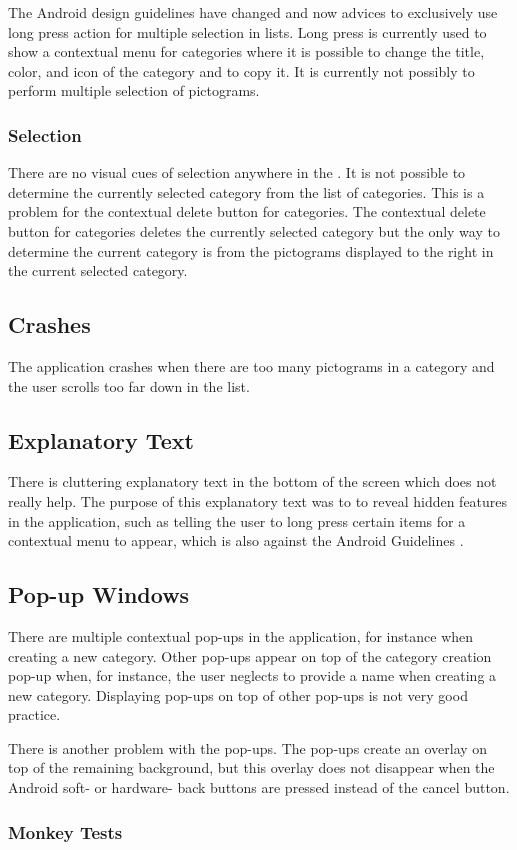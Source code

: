 The Android design guidelines have changed and now advices to exclusively use long press action for multiple selection in lists. Long press is currently used to show a contextual menu for categories where it is possible to change the title, color, and icon of the category and to copy it. It is currently not possibly to perform multiple selection of pictograms. 

\subsubsection{Selection}

There are no visual cues of selection anywhere in the \ct. It is not possible to determine the currently selected category from the list of categories. This is a problem for the contextual delete button for categories. The contextual delete button for categories deletes the currently selected category but the only way to determine the current category is from the pictograms displayed to the right in the current selected category. 

\subsection{Crashes}

The application crashes when there are too many pictograms in a category and the user scrolls too far down in the list. 

\subsection{Explanatory Text}

There is cluttering explanatory text in the bottom of the screen which does not really help. The purpose of this explanatory text was to to reveal hidden features in the application, such as telling the user to long press certain items for a contextual menu to appear, which is also against the Android Guidelines \parencite{android_guidelines_longpress}.

\subsection{Pop-up Windows}

There are multiple contextual pop-ups in the application, for instance when creating a new category. Other pop-ups appear on top of the category creation pop-up when, for instance, the user neglects to provide a name when creating a new category. Displaying pop-ups on top of other pop-ups is not very good practice.

There is another problem with the pop-ups. The pop-ups create an overlay on top of the remaining background, but this overlay does not disappear when the Android soft- or hardware- back buttons are pressed instead of the cancel button. 
 
\subsubsection{Monkey Tests}
